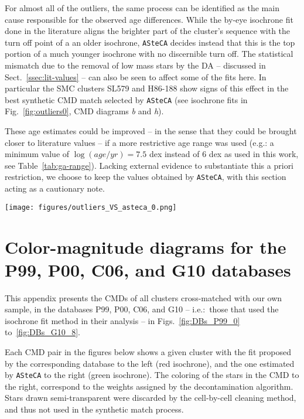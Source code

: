 \documentclass[draft]{aa}
\begin{document}
\begin{appendix}
For almost all of the outliers, the same process can be identified as the main
cause responsible for the observed age differences.
While the by-eye isochrone fit done in the literature aligns the brighter
part of the cluster's sequence with the turn off point of a an older
isochrone, \texttt{ASteCA} decides instead that this is the top portion of a
much younger isochrone with no discernible turn off.
%
The statistical mismatch due to the removal of low mass stars by the DA
-- discussed in Sect.~\ref{ssec:lit-values} -- can also be seen to affect some
of the fits here. In particular the SMC clusters SL579 and H86-188 show signs of
this effect in the best synthetic CMD match selected by \texttt{ASteCA}
(see isochrone fits in Fig.~\ref{fig:outliers0}, CMD diagrams \emph{b} and
\emph{h}).

These age estimates could be improved -- in the sense that they could
be brought closer to literature values -- if a more restrictive age range was
used (e.g.: a minimum value of $\log(age/yr){=}7.5$ dex instead of 6 dex as used
in this work, see Table~\ref{tab:ga-range}).
Lacking external evidence to substantiate this a priori restriction, we choose
to keep the values obtained by \texttt{ASteCA}, with this section acting as a
cautionary note.

\begin{figure*}
\texttt{[image: figures/outliers\_VS\_asteca\_0.png]}
\caption{CMDs for the outliers set. See description of the plots in the main
text of the section.}
\label{fig:outliers0}
\end{figure*}





\section{Color-magnitude diagrams for the P99, P00, C06, and G10 databases}
\label{apdx:databases}

This appendix presents the CMDs of all clusters cross-matched with our own
sample, in the databases P99, P00, C06, and G10 -- i.e.:\ those that used the
isochrone fit method in their analysis -- in Figs.~\ref{fig:DBs_P99_0}
to~\ref{fig:DBs_G10_8}.

Each CMD pair in the figures below shows a given cluster with the fit proposed
by the corresponding database to the left (red isochrone), and the one estimated
by \texttt{ASteCA} to the right (green isochrone).
The coloring of the stars in the CMD to the right, correspond to the weights
assigned by the decontamination algorithm. Stars drawn semi-transparent were
discarded by the cell-by-cell cleaning method, and thus not used in the
synthetic match process.


\end{appendix}
\end{document}
